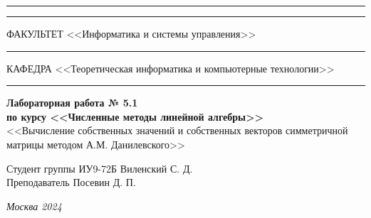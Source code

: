 \documentclass[a4paper, 14pt]{extarticle}
\begin{document}
\begin{titlepage}
\vspace{-25pt}
\hspace{-35pt}\rule{\textwidth}{2.3pt}

\vspace*{-20.3pt}
\hspace{-35pt}\rule{\textwidth}{0.4pt}

\vspace{1.5ex}
\hspace{-35pt} \noindent \small ФАКУЛЬТЕТ\hspace{80pt} <<Информатика и системы управления>>

\vspace*{-16pt}
\hspace{47pt}\rule{0.83\textwidth}{0.4pt}

\vspace{0.5ex}
\hspace{-35pt} \noindent \small КАФЕДРА\hspace{50pt} <<Теоретическая информатика и компьютерные технологии>>

\vspace*{-16pt}
\hspace{30pt}\rule{0.866\textwidth}{0.4pt}
  
\vspace{11em}

\begin{center}
\Large {\bf Лабораторная работа № 5.1} \\ 
\large {\bf по курсу <<Численные методы линейной алгебры>>} \\
\large <<Вычисление собственных значений и собственных векторов симметричной матрицы методом А.М. Данилевского>> 
\end{center}\normalsize

\vspace{8em}


\begin{flushright}
  {Студент группы ИУ9-72Б Виленский С. Д. \hspace*{15pt}\\ 
  \vspace{2ex}
  Преподаватель Посевин Д. П.\hspace*{15pt}}
\end{flushright}

\bigskip

\vfill
 

\begin{center}
\textsl{Москва 2024}
\end{center}
\end{titlepage}
\end{document}
